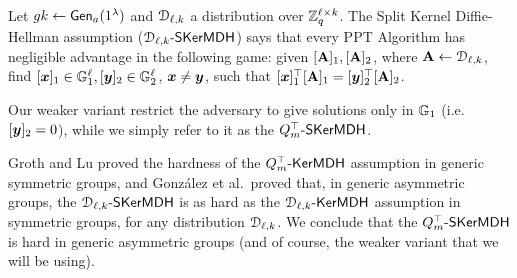 \begin{definition} Let  ${gk} 
\gets\mathsf{Gen}_a(1^\lambda)$ and $\mathcal{D}_{\ell,k}$ a distribution over $\mathbb{Z}_q^{\ell\times k}$.
The Split Kernel Diffie-Hellman assumption ($\mathcal{D}_{\ell,k}\mbox{-}\mathsf{SKerMDH}$) says that every PPT Algorithm has negligible advantage in the following  game: given $[\mathbf{{A}}]_1,[\mathbf{{A}}]_2$, where $\mathbf{{A}} \gets \mathcal{D}_{\ell,k}$, find $[{\boldsymbol{x}}]_1\in\mathbb{G}_1^\ell,[{\boldsymbol{y}}]_2 \in \mathbb{G}^{\ell}_{2}$, ${\boldsymbol{x}}\neq{\boldsymbol{y}}$, such that 
$[{\boldsymbol{x}}]_{1}^{\top}[\mathbf{{A}}]_1=[{\boldsymbol{y}}]_2^\top[\mathbf{{A}}]_2$. 
\end{definition}
 Our weaker variant restrict the adversary to give solutions only in $\mathbb{G}_1$ (i.e.~$[{\boldsymbol{y}}]_2=0$), while we simply refer to it as the $Q_m^\top\mbox{-}\mathsf{SKerMDH}$.

Groth and Lu proved the hardness of the $Q_m^\top\mbox{-}\mathsf{KerMDH}$ assumption in generic symmetric groups, and Gonz\'alez et al.~proved that, in generic asymmetric groups, the $\mathcal{D}_{\ell,k}\mbox{-}\mathsf{SKerMDH}$ is as hard as the $\mathcal{D}_{\ell,k}\mbox{-}\mathsf{KerMDH}$ assumption in symmetric groups, for any distribution $\mathcal{D}_{\ell,k}$. We conclude that the $Q_m^\top\mbox{-}\mathsf{SKerMDH}$ is hard in generic asymmetric groups (and of course, the weaker variant that we will be using).